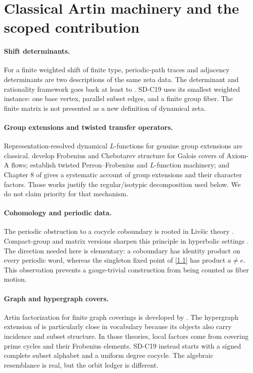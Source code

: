 \section{Classical Artin machinery and the scoped contribution}
\label{sec:classical}

\paragraph{Shift determinants.}
For a finite weighted shift of finite type, periodic-path traces and adjacency
determinants are two descriptions of the same zeta data.  The determinant and
rationality framework goes back at least to
\citet{BowenLanford1970}.  SD-C19 uses its smallest weighted instance: one base
vertex, parallel subset edges, and a finite group fiber.  The finite matrix is
not presented as a new definition of dynamical zeta.

\paragraph{Group extensions and twisted transfer operators.}
Representation-resolved dynamical \(L\)-functions for genuine group extensions
are classical.  \citet{ParryPollicott1986} develop Frobenius and Chebotarev
structure for Galois covers of Axiom-A flows;
\citet{AdachiSunada1987} establish twisted Perron--Frobenius and \(L\)-function
machinery; and Chapter 8 of \citet{ParryPollicott1990} gives a systematic
account of group extensions and their character factors.  Those works justify
the regular/isotypic decomposition used below.  We do not claim priority for
that mechanism.

\paragraph{Cohomology and periodic data.}
The periodic obstruction to a cocycle coboundary is rooted in Livšic theory
\citep{Livsic1972}.  Compact-group and matrix versions sharpen this principle
in hyperbolic settings \citep{ParryPollicott1997,Kalinin2011}.  The direction
needed here is elementary: a coboundary has identity product on every periodic
word, whereas the singleton fixed point of \eqref{1.1} has product \(a\ne e\).
This observation prevents a gauge-trivial construction from being counted as
fiber motion.

\paragraph{Graph and hypergraph covers.}
Artin factorization for finite graph coverings is developed by
\citet{StarkTerras1996,StarkTerras2000}.  The hypergraph extension of
\citet{EylerJun2024} is particularly close in vocabulary because its objects
also carry incidence and subset structure.  In those theories, local factors
come from covering prime cycles and their Frobenius elements.  SD-C19 instead
starts with a signed complete subset alphabet and a uniform degree cocycle.
The algebraic resemblance is real, but the orbit ledger is different.

